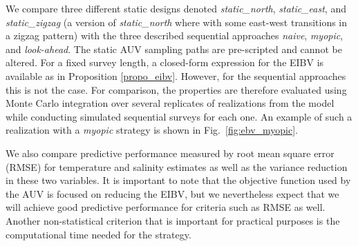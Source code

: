 \documentclass[aoas]{imsart}
\begin{document}
We compare three different static designs denoted
\textit{static\_north}, \textit{static\_east}, and
\textit{static\_zigzag} (a version of \textit{static\_north} where with some east-west transitions in a zigzag pattern) with the three described sequential approaches
\textit{naive}, \textit{myopic}, and \textit{look-ahead}. The static
AUV sampling paths are pre-scripted and cannot be altered.
For a fixed survey length, a closed-form expression for the EIBV is
available as in Proposition \ref{propo_eibv}. However, for the sequential
approaches this is not the case. For comparison, the properties are
therefore evaluated using Monte Carlo integration over several replicates
of realizations from the model while conducting simulated sequential
surveys for each one. An example of such a realization with a \textit{myopic}
strategy is shown in Fig.~\ref{fig:ebv_myopic}. 

We also compare predictive
performance measured by root mean square error (RMSE) for temperature
and salinity estimates as well as the variance reduction in these
two variables. It is important to note that the objective function
used by the AUV is focused on reducing the
EIBV, but we nevertheless expect that we will achieve good predictive
performance for criteria such as RMSE as well. Another non-statistical
criterion that is important for practical purposes is the computational
time needed for the strategy.
\end{document}
